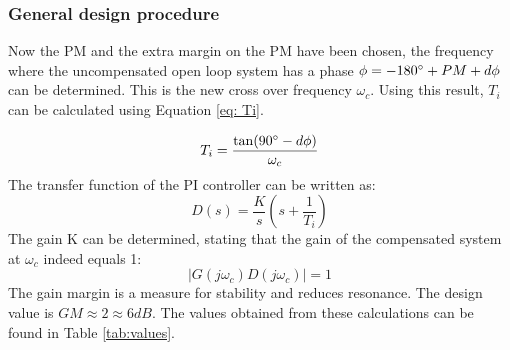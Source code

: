 \documentclass[a4paper,kul]{kulakarticle} %
\begin{document}
\subsubsection{General design procedure}
\label{sec:designprocedure}
Now the PM and the extra margin on the PM have been chosen, the frequency where the uncompensated open loop system has a phase $\phi = -180\degree + PM + d\phi$ can be determined. This is the new cross over frequency $\omega_c$. Using this result, $T_i$ can be calculated using Equation \ref{eq: Ti}. 

\begin{equation}
	\label{eq: Ti}
	T_i = \frac{\tan(90\degree - d\phi)}{\omega_c}
\end{equation} 
The transfer function of the PI controller can be written as:
\begin{equation}
	\label{eq: TF PI}
	D(s) = \frac{K}{s}(s+\frac{1}{T_i})
\end{equation}
The gain K can be determined, stating that the gain of the compensated system at $\omega_c$ indeed equals 1:
\begin{equation}
	|G(j\omega_c)D(j\omega_c)| = 1
\end{equation}
The gain margin is a measure for stability and reduces resonance. The design value is $GM \approx 2 \approx 6 dB$. The values obtained from these calculations can be found in Table \ref{tab:values}. 
\end{document}
